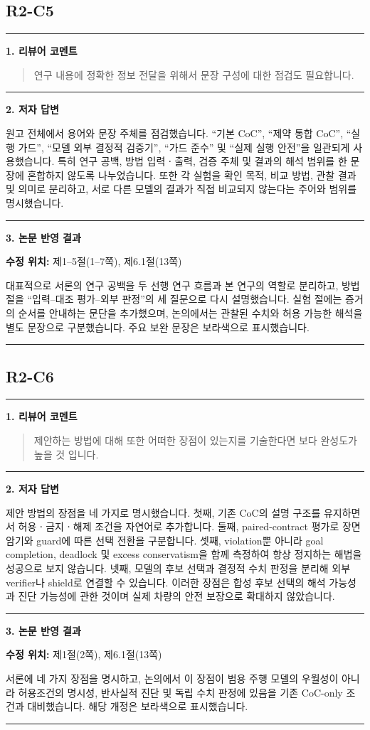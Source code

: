 \documentclass[11pt]{article}
\newcommand{\fieldheading}[2]{%
  \par\medskip\noindent
  {\color{#1}\rule{3pt}{1.25em}}\hspace{0.55em}\textbf{#2}\par\smallskip}
\newenvironment{reviewitem}[1]
  {\subsection*{#1}}
  {\par\medskip\hrule\bigskip}
\newenvironment{reviewercomment}
  {\fieldheading{reviewercolor}{1. 리뷰어 코멘트}%
   \begin{quote}}
  {\end{quote}}
\newenvironment{authorresponse}
  {\fieldheading{responsecolor}{2. 저자 답변}}
  {\par}
\newenvironment{manuscriptrevision}[1]
  {\fieldheading{revisioncolor}{3. 논문 반영 결과}%
   \textbf{수정 위치:} #1\par\smallskip}
  {\par}
\begin{document}
\begin{reviewitem}{R2-C5}
  \begin{reviewercomment}
    연구 내용에 정확한 정보 전달을 위해서 문장 구성에 대한 점검도 필요합니다.
  \end{reviewercomment}

  \begin{authorresponse}
    원고 전체에서 용어와 문장 주체를 점검했습니다. ``기본 CoC'', ``제약 통합
    CoC'', ``실행 가드'', ``모델 외부 결정적 검증기'', ``가드 준수'' 및 ``실제
    실행 안전''을 일관되게 사용했습니다. 특히 연구 공백, 방법 입력ㆍ출력, 검증
    주체 및 결과의 해석 범위를 한 문장에 혼합하지 않도록 나누었습니다. 또한 각
    실험을 확인 목적, 비교 방법, 관찰 결과 및 의미로 분리하고, 서로 다른 모델의
    결과가 직접 비교되지 않는다는 주어와 범위를 명시했습니다.
  \end{authorresponse}

  \begin{manuscriptrevision}{제1--5절(1--7쪽), 제6.1절(13쪽)}
    대표적으로 서론의 연구 공백을 두 선행 연구 흐름과 본 연구의 역할로 분리하고,
    방법 절을 ``입력--대조 평가--외부 판정''의 세 질문으로 다시 설명했습니다.
    실험 절에는 증거의 순서를 안내하는 문단을 추가했으며, 논의에서는 관찰된
    수치와 허용 가능한 해석을 별도 문장으로 구분했습니다. 주요 보완 문장은
    보라색으로 표시했습니다.
  \end{manuscriptrevision}
\end{reviewitem}

\begin{reviewitem}{R2-C6}
  \begin{reviewercomment}
    제안하는 방법에 대해 또한 어떠한 장점이 있는지를 기술한다면 보다 완성도가
    높을 것 입니다.
  \end{reviewercomment}

  \begin{authorresponse}
    제안 방법의 장점을 네 가지로 명시했습니다. 첫째, 기존 CoC의 설명 구조를
    유지하면서 허용ㆍ금지ㆍ해제 조건을 자연어로 추가합니다. 둘째, paired-contract
    평가로 장면 암기와 guard에 따른 선택 전환을 구분합니다. 셋째, violation뿐
    아니라 goal completion, deadlock 및 excess conservatism을 함께 측정하여 항상
    정지하는 해법을 성공으로 보지 않습니다. 넷째, 모델의 후보 선택과 결정적 수치
    판정을 분리해 외부 verifier나 shield로 연결할 수 있습니다. 이러한 장점은
    합성 후보 선택의 해석 가능성과 진단 가능성에 관한 것이며 실제 차량의 안전
    보장으로 확대하지 않았습니다.
  \end{authorresponse}

  \begin{manuscriptrevision}{제1절(2쪽), 제6.1절(13쪽)}
    서론에 네 가지 장점을 명시하고, 논의에서 이 장점이 범용 주행 모델의 우월성이
    아니라 허용조건의 명시성, 반사실적 진단 및 독립 수치 판정에 있음을 기존
    CoC-only 조건과 대비했습니다. 해당 개정은 보라색으로 표시했습니다.
  \end{manuscriptrevision}
\end{reviewitem}
\end{document}
